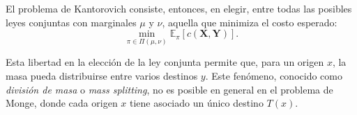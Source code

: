 \documentclass[12pt, a4paper]{amsbook}
\theoremstyle{remark}
\theoremstyle{definition}
\numberwithin{section}{chapter}
\numberwithin{subsection}{section}
\numberwithin{equation}{section}
\numberwithin{figure}{chapter}
\begin{document}
El problema de Kantorovich consiste, entonces, en elegir, entre todas
las posibles leyes conjuntas con marginales $\mu$ y $\nu$, aquella que
minimiza el costo esperado:
\[
\min_{\pi\in\Pi(\mu,\nu)}
\mathbb E_{\pi}[c(\mathbf X,\mathbf Y)].
\]

Esta libertad en la elección de la ley conjunta permite que, para un
origen $x$, la masa pueda distribuirse entre varios destinos $y$. Este
fenómeno, conocido como \emph{división de masa} o \emph{mass splitting},
no es posible en general en el problema de Monge, donde cada origen
$x$ tiene asociado un único destino $T(x)$.
%
%
%
%
\end{document}
